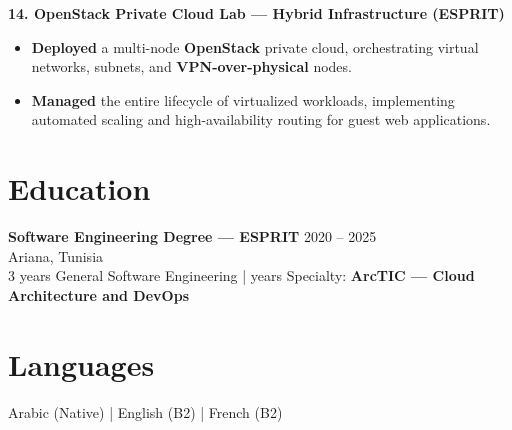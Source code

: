 \documentclass[10pt, letterpaper]{article}
\newenvironment{highlights}{
\begin{itemize}[leftmargin=12pt, itemsep=2pt]
}{
\end{itemize}
}
\begin{document}
\textbf{14. OpenStack Private Cloud Lab --- Hybrid Infrastructure (ESPRIT)}
\begin{highlights}
\item \textbf{Deployed} a multi-node \textbf{OpenStack} private cloud, orchestrating virtual networks, subnets, and \textbf{VPN-over-physical} nodes.
\item \textbf{Managed} the entire lifecycle of virtualized workloads, implementing automated scaling and high-availability routing for guest web applications.
\end{highlights}

\section{Education}
\textbf{Software Engineering Degree --- ESPRIT} \hfill 2020 -- 2025 \\
Ariana, Tunisia \\
3 years General Software Engineering \;| years Specialty: \textbf{ArcTIC --- Cloud Architecture and DevOps}

\section{Languages}
Arabic (Native) \;|\; English (B2) \;|\; French (B2)
\end{document}
